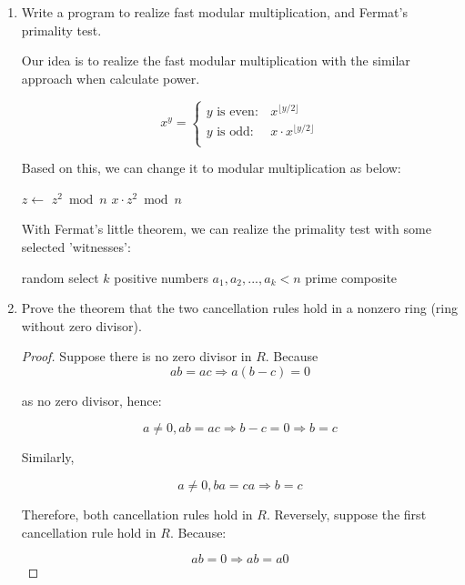 \documentclass[UTF8]{article}
\begin{document}
\begin{enumerate}
\item {Write a program to realize fast modular multiplication, and Fermat's primality test.}

Our idea is to realize the fast modular multiplication with the similar approach when calculate power.

\[
x^y =
\begin{cases}
y \text{ is even}: & x^{\lfloor y / 2 \rfloor} \\
y \text{ is odd}: & x \cdot x^{\lfloor y / 2 \rfloor} \\
\end{cases}
\]

Based on this, we can change it to modular multiplication as below:

\begin{algorithmic}
    \State {}
  \EndIf
  \State $z \gets$ 
    \State \Return $z^2 \bmod n$
  \Else
    \State \Return $x \cdot z^2 \bmod n$
  \EndIf
\EndFunction
\end{algorithmic}

With Fermat's little theorem, we can realize the primality test with some selected 'witnesses':

\begin{algorithmic}
  \State random select $k$ positive numbers $a_1, a_2, ..., a_k < n$
    \State \Return prime
  \Else
    \State \Return composite
  \EndIf
\EndFunction
\end{algorithmic}

\item {Prove the theorem that the two cancellation rules hold in a nonzero ring (ring without zero divisor).}

\begin{proof}
Suppose there is no zero divisor in $R$. Because
\[
  ab = ac \Rightarrow a(b - c) = 0
\]

as no zero divisor, hence:

\[
  a \neq 0, ab = ac \Rightarrow b - c = 0 \Rightarrow b = c
\]

Similarly,

\[
  a \neq 0, ba = ca \Rightarrow b = c
\]

Therefore, both cancellation rules hold in $R$. Reversely, suppose the first cancellation rule hold in $R$. Because:

\[
  ab = 0 \Rightarrow ab = a0
\]


\end{proof}
\end{enumerate}
\end{document}
